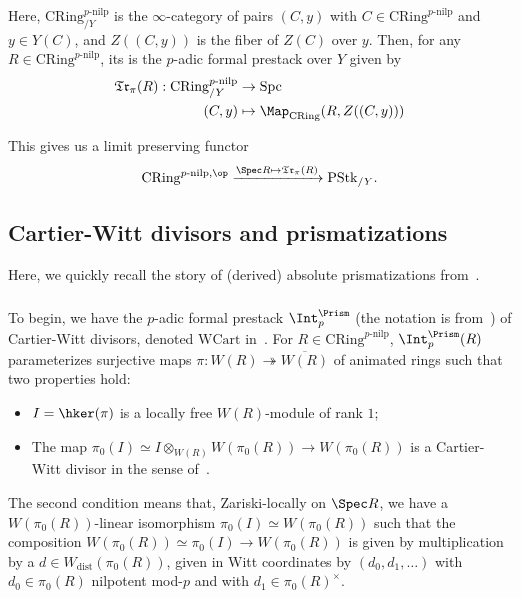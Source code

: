 \documentclass[10pt]{amsart}
\begin{document}
Here, $\mathrm{CRing}^{p\text{-nilp}}_{/Y}$ is the $\infty$-category of pairs $(C,y)$ with $C\in \mathrm{CRing}^{p\text{-nilp}}$ and $y\in Y(C)$, and $Z((C,y))$ is the fiber of $Z(C)$ over $y$. Then, for any $R\in \mathrm{CRing}^{p\text{-nilp}}$, its  is the $p$-adic formal prestack over $Y$ given by
\begin{align*}
\mathfrak{Tr}_\pi(R):\mathrm{CRing}^{p\text{-nilp}}_{/Y}&\to \mathrm{Spc}\\
(C,y)&\mapsto \Map_{\mathrm{CRing}}(R,Z((C,y)))
\end{align*}


This gives us a limit preserving functor
\[
\mathrm{CRing}^{p\text{-nilp},\op}\xrightarrow{\Spec R \mapsto \mathfrak{Tr}_\pi(R)}\mathrm{PStk}_{/Y}.
\]

\subsection{Cartier-Witt divisors and prismatizations}
\label{subsec:cartier-witt}

Here, we quickly recall the story of (derived) absolute prismatizations from~\cite[\S 8]{bhatt2022prismatization}. 

\subsubsection{}
To begin, we have the $p$-adic formal prestack $\Int_p^\Prism$ (the notation is from~\cite{bhatt_lectures}) of Cartier-Witt divisors, denoted $\mathrm{WCart}$ in~\cite{bhatt2022absolute}. For $R\in \mathrm{CRing}^{p\text{-nilp}}$, $\Int_p^\Prism(R)$ parameterizes surjective maps $\pi:W(R)\twoheadrightarrow \overline{W(R)}$ of animated rings such that two properties hold:
\begin{itemize}
   \item $I = \hker(\pi)$ is a locally free $W(R)$-module of rank $1$;
   \item The map $\pi_0(I) \simeq I\otimes_{W(R)}W(\pi_0(R))\to W(\pi_0(R))$ is a Cartier-Witt divisor in the sense of~\cite[\S 3.1.1]{bhatt2022absolute}. 
\end{itemize}

The second condition means that, Zariski-locally on $\Spec R$, we have a $W(\pi_0(R))$-linear isomorphism $\pi_0(I)\simeq W(\pi_0(R))$ such that the composition $W(\pi_0(R))\simeq \pi_0(I)\to W(\pi_0(R))$ is given by multiplication by a  $d\in W_{\mathrm{dist}}(\pi_0(R))$, given in Witt coordinates by $(d_0,d_1,\ldots)$ with $d_0\in \pi_0(R)$ nilpotent mod-$p$ and with $d_1\in \pi_0(R)^\times$.
\end{document}
